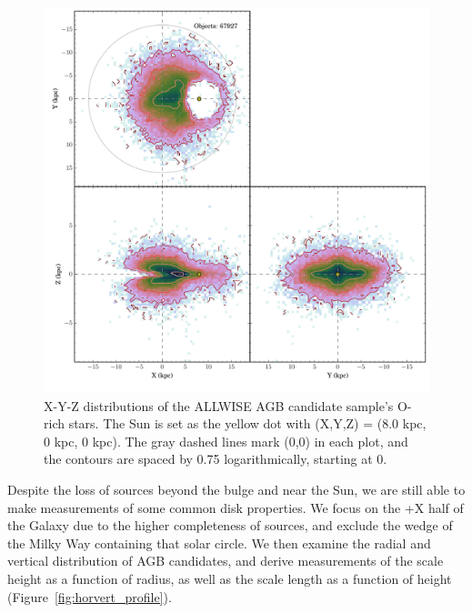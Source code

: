 \begin{figure}[h]
\centering
\includegraphics[width=5in]{figs/orich_candidates_xyz.pdf}
\caption{{\footnotesize X-Y-Z distributions of the ALLWISE AGB candidate sample's O-rich stars. The Sun is set as the yellow dot with (X,Y,Z) = (8.0 kpc, 0 kpc, 0 kpc). The gray dashed lines mark (0,0) in each plot, and the contours are spaced by 0.75 logarithmically, starting at 0.}}
\label{fig:xyz_candidates}
\end{figure}

Despite the loss of sources beyond the bulge and near the Sun, we are still able to make measurements of some common disk properties. We focus on the +X half of the Galaxy due to the higher completeness of sources, and exclude the wedge of the Milky Way containing that solar circle. We then examine the radial and vertical distribution of AGB candidates, and derive measurements of the scale height as a function of radius, as well as the scale length as a function of height (Figure~\ref{fig:horvert_profile}).

